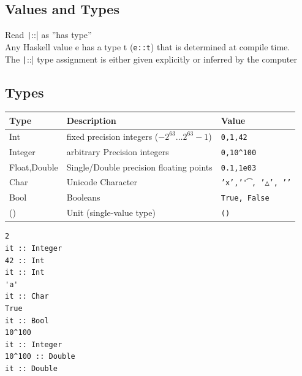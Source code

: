 \documentclass{article}
\newcommand{\Haskell}[1]{\texttt{#1}}
\begin{document}
\subsection{Values and Types}
Read \texttt|::| as ''has type''\\
Any Haskell value e has a type t (\texttt{e::t}) that is determined at compile time.\\
The \texttt|::| type assignment is either given explicitly or inferred by the computer
\subsection{Types}
\begin{tabular}{lll}
Type&Description&Value\\
\hline
Int & fixed precision integers ($-2^{63}\ldots2^{63}-1$)&\Haskell{0,1,42}\\
Integer & arbitrary Precision integers & \Haskell{0,10^100}\\
Float,Double & Single/Double precision floating points & \Haskell{0.1,1e03}\\
Char & Unicode Character&\texttt{'x','\t', '△', '\8710'}\\
Bool & Booleans & \texttt{True, False}\\
() & Unit (single-value type) & \texttt{()}
\end{tabular}
\begin{verbatim}
2
it :: Integer
42 :: Int 
it :: Int
'a' 
it :: Char
True 
it :: Bool
10^100 
it :: Integer
10^100 :: Double 
it :: Double
\end{verbatim}
\end{document}
